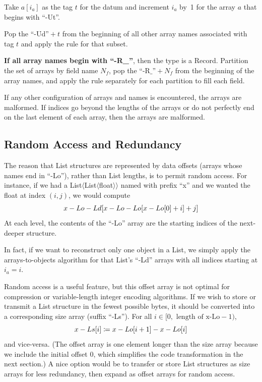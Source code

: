 \documentclass[10pt, conference, compsocconf]{IEEEtran}
\begin{document}
Take $a[i_a]$ as the tag $t$ for the datum and increment $i_a$ by~1 for the array $a$ that begins with ``-Ut''.

Pop the $\mbox{``-Ud''} + t$ from the beginning of all other array names associated with tag $t$ and apply the rule for that subset.

{\bf If all array names begin with ``-R\_''}, then the type is a Record. Partition the set of arrays by field name $N_f$, pop the $\mbox{``-R\_''} + N_f$ from the beginning of the array names, and apply the rule separately for each partition to fill each field.

If any other configuration of arrays and names is encountered, the arrays are malformed. If indices go beyond the lengths of the arrays or do not perfectly end on the last element of each array, then the arrays are malformed.

\subsection{Random Access and Redundancy}
\label{random-access-and-redundancy}

The reason that List structures are represented by data offsets (arrays whose names end in ``-Lo''), rather than List lengths, is to permit random access. For instance, if we had a List$\langle$List$\langle$float$\rangle\rangle$ named with prefix ``x'' and we wanted the float at index $(i, j)$, we would compute
\[ \mbox{x-Lo-Ld{\tt [}x-Lo-Lo{\tt [}x-Lo{\tt [}} 0 \mbox{\tt ]} + i \mbox{\tt ]} + j \mbox{\tt ]} \]
At each level, the contents of the ``-Lo'' array are the starting indices of the next-deeper structure.

In fact, if we want to reconstruct only one object in a List, we simply apply the arrays-to-objects algorithm for that List's ``-Ld'' arrays with all indices starting at $i_a = i$.

Random access is a useful feature, but this offset array is not optimal for compression or variable-length integer encoding algorithms. If we wish to store or transmit a List structure in the fewest possible bytes, it should be converted into a corresponding size array (suffix ``-Ls''). For all $i \in [0, \mbox{ length of x-Lo} - 1)$,
\[ \mbox{x-Ls{\tt [}} i \mbox{\tt ]} \coloneqq \mbox{x-Lo{\tt [}} i + 1 \mbox{\tt ]} - \mbox{x-Lo{\tt [}} i \mbox{\tt ]} \]
and vice-versa. (The offset array is one element longer than the size array because we include the initial offset 0, which simplifies the code transformation in the next section.) A nice option would be to transfer or store List structures as size arrays for less redundancy, then expand as offset arrays for random access.
\end{document}
